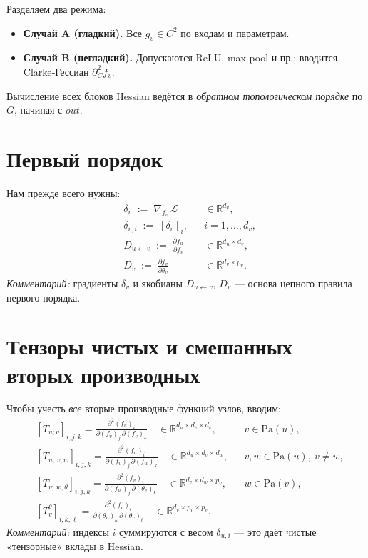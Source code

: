 \documentclass[a4paper,12pt]{article}
\newcommand{\Pa}{\mathrm{Pa}} %
\begin{document}
Разделяем два режима:
\begin{itemize}
  \item \textbf{Случай A (гладкий).} Все $g_v\in C^2$ по входам и параметрам.
  \item \textbf{Случай B (негладкий).} Допускаются ReLU, max‐pool и пр.; вводится Clarke‐Гессиан $\partial_C^2 f_v$.
\end{itemize}

Вычисление всех блоков Hessian ведётся в \emph{обратном топологическом порядке} по $G$, начиная с $out$.

\section{Первый порядок}
Нам прежде всего нужны:
\begin{align*}
  &\delta_v \;:=\; \nabla_{f_v}\,\mathcal L
  &&\in\mathbb{R}^{d_v},
  \\[-2pt]
  &\delta_{v,i} \;:=\; [\delta_v]_i,
  &&i=1,\dots,d_v,
  \\[3pt]
  &D_{u\gets v}
  \;:=\;\frac{\partial f_u}{\partial f_v}
  &&\in\mathbb{R}^{d_u\times d_v},
  \\[-2pt]
  &D_v
  \;:=\;\frac{\partial f_v}{\partial\theta_v}
  &&\in\mathbb{R}^{d_v\times p_v}.
\end{align*}
\emph{Комментарий:} градиенты $\delta_v$ и якобианы $D_{u\gets v}$, $D_v$ — основа цепного правила первого порядка.

\section{Тензоры чистых и смешанных вторых производных}
Чтобы учесть \emph{все} вторые производные функций узлов, вводим:
\begin{align*}
  &[T_{u;v}]_{i,j,k}
  = \frac{\partial^2 (f_u)_i}{\partial(f_v)_j\,\partial(f_v)_k}
  \quad\in\mathbb{R}^{d_u\times d_v\times d_v},
  &&v\in\Pa(u),
  \\[3pt]
  &[T_{u;\,v,w}]_{i,j,k}
  = \frac{\partial^2 (f_u)_i}{\partial(f_v)_j\,\partial(f_w)_k}
  \quad\in\mathbb{R}^{d_u\times d_v\times d_w},
  &&v,w\in\Pa(u),\ v\neq w,
  \\[3pt]
  &[T_{v;\,w,\theta}]_{i,j,k}
  = \frac{\partial^2 (f_v)_i}{\partial(f_w)_j\,\partial(\theta_v)_k}
  \quad\in\mathbb{R}^{d_v\times d_w\times p_v},
  &&w\in\Pa(v),
  \\[3pt]
  &[T_v^\theta]_{i,k,\ell}
  = \frac{\partial^2 (f_v)_i}{\partial(\theta_v)_k\,\partial(\theta_v)_\ell}
  \quad\in\mathbb{R}^{d_v\times p_v\times p_v}.
\end{align*}
\emph{Комментарий:} индексы $i$ суммируются с весом $\delta_{u,i}$ — это даёт чистые «тензорные» вклады в Hessian.
\end{document}
